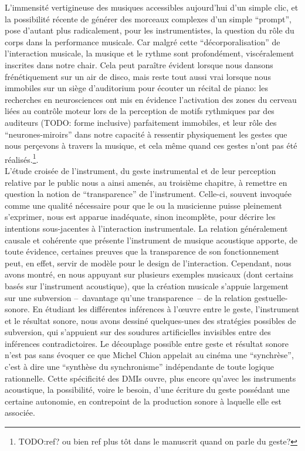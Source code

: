 L'immensité vertigineuse des musiques accessibles aujourd'hui d'un simple clic, et la possibilité récente de générer des morceaux complexes d'un simple ``prompt'', pose d'autant plus radicalement, pour les instrumentistes, la question du rôle du corps dans la performance musicale. Car malgré cette ``décorporalisation'' de l'interaction musicale, la musique et le rythme sont profondément, viscéralement inscrites dans notre chair. Cela peut paraître évident lorsque nous dansons frénétiquement sur un air de disco, mais reste tout aussi vrai lorsque nous immobiles sur un siège d'auditorium pour écouter un récital de piano: les recherches en neurosciences ont mis en évidence l'activation des zones du cerveau liées au contrôle moteur lors de la perception de motifs rythmiques par des auditeurs (TODO: forme inclusive) parfaitement immobiles, et leur rôle des ``neurones-miroirs'' dans notre capacité à ressentir physiquement les gestes que nous perçevons à travers la musique, et cela même quand ces gestes n'ont pas été réalisés.\footnote{TODO:ref? ou bien ref plus tôt dans le manuscrit quand on parle du geste?}.\\


\noindent L’étude croisée de l’instrument, du geste instrumental et de leur perception relative par le public nous a ainsi amenés, au troisième chapitre, à remettre en question la notion de ``transparence'' de l’instrument. Celle-ci, souvent invoquée comme une qualité nécessaire pour que le ou la musicienne puisse pleinement s’exprimer, nous est apparue inadéquate, sinon incomplète, pour décrire les intentions sous-jacentes à l’interaction instrumentale. La relation généralement causale et cohérente que présente l’instrument de musique acoustique apporte, de toute évidence, certaines preuves que la transparence de son fonctionnement peut, en effet, servir de modèle pour le design de l’interaction. Cependant, nous avons montré, en nous appuyant sur plusieurs exemples musicaux (dont certains basés sur l’instrument acoustique), que la création musicale s’appuie largement sur une subversion --~davantage qu’une transparence~-- de la relation gestuelle-sonore. En étudiant les différentes inférences à l’œuvre entre le geste, l’instrument et le résultat sonore, nous avons dessiné quelques-unes des stratégies possibles de subversion, qui s’appuient sur des soudures artificielles invisibles entre des inférences contradictoires. Le découplage possible entre geste et résultat sonore n'est pas sans évoquer ce que Michel Chion appelait au cinéma une ``synchrèse'', c'est à dire une ``synthèse du synchronisme'' indépendante de toute logique rationnelle\cite{chion_audio-vision:_2013}. Cette spécificité des \glspl{DMI} ouvre, plus encore qu'avec les instruments acoustique, la possibilité, voire le besoin, d'une écriture du geste possédant une certaine autonomie, en contrepoint de la production sonore à laquelle elle est associée.

